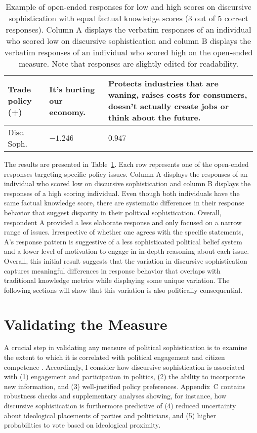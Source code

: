 \begin{table}[ht]
\begin{tabular}{l|p{5.0cm}|p{7.6cm}}
					\\\hdashline
Trade policy (+)	& It's hurting our economy.
					& Protects industries that are waning, raises costs for consumers, doesn't actually create jobs or think about the future.
					\\\midrule
Disc. Soph. 		& $-1.246$
					& $0.947$
					\\\bottomrule
\end{tabular}
\caption[Example of open-ended responses for low and high scores on discursive sophistication]{Example of open-ended responses for low and high scores on discursive sophistication with equal factual knowledge scores (3 out of 5 correct responses). Column A displays the verbatim responses of an individual who scored low on discursive sophistication and column B displays the verbatim responses of an individual who scored high on the open-ended measure. Note that responses are slightly edited for readability.}\label{tab:ex1}
\end{table}

The results are presented in Table~\ref{tab:ex1}. Each row represents one of the open-ended responses targeting specific policy issues. Column A displays the responses of an individual who scored low on discursive sophistication and column B displays the responses of a high scoring individual. Even though both individuals have the same factual knowledge score, there are systematic differences in their response behavior that suggest disparity in their political sophistication. Overall, respondent A provided a less elaborate response and only focused on a narrow range of issues. Irrespective of whether one agrees with the specific statements, A's response pattern is suggestive of a less sophisticated political belief system and a lower level of motivation to engage in in-depth reasoning about each issue. Overall, this initial result suggests that the variation in discursive sophistication captures meaningful differences in response behavior that overlaps with traditional knowledge metrics while displaying some unique variation. The following sections will show that this variation is also politically consequential.



\section*{Validating the Measure}

A crucial step in validating any measure of political sophistication is to examine the extent to which it is correlated with political engagement and citizen competence \citep{lupia2006elitism,lupia2015uninformed}. Accordingly, I consider how discursive sophistication is associated with (1) engagement and participation in politics, (2) the ability to incorporate new information, and (3) well-justified policy preferences. Appendix~C contains robustness checks and supplementary analyses showing, for instance, how discursive sophistication is furthermore predictive of (4) reduced uncertainty about ideological placements of parties and politicians, and (5) higher probabilities to vote based on ideological proximity.


